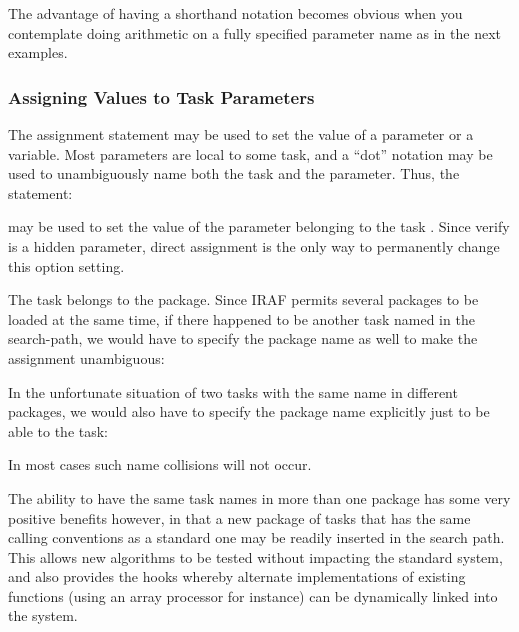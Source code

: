 \noindent
The advantage of having a shorthand notation becomes obvious
when you contemplate doing arithmetic on a fully specified
parameter name as in the next examples.

\subsubsection{Assigning Values to Task Parameters}

The assignment statement may be used to set the value of a parameter
or a variable.
Most parameters are local to some task, and a ``dot'' notation may
be used to unambiguously name both the task and the parameter.
Thus, the statement:

\begin{quotation}\noindent
{} 
\end{quotation}

\noindent
may be used to set the value of the  parameter 
belonging to the task .  Since verify is a hidden
parameter, direct assignment is the only way to permanently change
this option setting.

The task  belongs to the  package.
Since IRAF permits several packages to be loaded at the same time,
if there happened to be another task named  in the
search-path, we would have to specify the package name as well to make
the assignment unambiguous:

\begin{quotation}\noindent
{} 
\end{quotation}

\noindent
In the unfortunate situation of two tasks with the same name in different
packages, we would also have to specify the package name explicitly
just to be able to  the task:

\begin{quotation}\noindent
{} 
\end{quotation}

\noindent
In most cases such name collisions will not occur.  

The ability to have
the same task names in more than one package has some very positive
benefits however, in that a new package of tasks that has the 
same calling conventions as a standard one may be readily inserted 
in the search path.  This allows new algorithms to be tested without
impacting the standard system, and also provides the hooks whereby
alternate implementations of existing functions (using an array processor
for instance) can be dynamically linked into the system.

